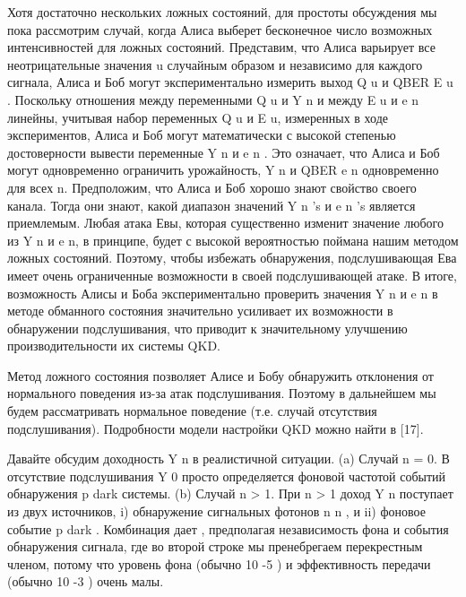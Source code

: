 Хотя достаточно нескольких ложных состояний, для простоты обсуждения мы пока рассмотрим случай, когда Алиса выберет бесконечное число возможных интенсивностей для ложных состояний. Представим, что Алиса варьирует все неотрицательные значения u случайным образом и независимо для каждого сигнала, Алиса и Боб могут экспериментально измерить выход Q u и QBER E u . Поскольку отношения между переменными Q u и Y n и между E u и e n линейны, учитывая набор переменных Q u и E u, измеренных в ходе экспериментов, Алиса и Боб могут математически с высокой степенью достоверности вывести переменные Y n и e n . Это означает, что Алиса и Боб могут одновременно ограничить урожайность, Y n и QBER e n одновременно для всех n. Предположим, что Алиса и Боб хорошо знают свойство своего канала. Тогда они знают, какой диапазон значений Y n 's и e n 's является приемлемым. Любая атака Евы, которая существенно изменит значение любого из Y n и e n, в принципе, будет с высокой вероятностью поймана нашим методом ложных состояний. Поэтому, чтобы избежать обнаружения, подслушивающая Ева имеет очень ограниченные возможности в своей подслушивающей атаке. В итоге, возможность Алисы и Боба экспериментально проверить значения Y n и e n в методе обманного состояния значительно усиливает их возможности в обнаружении подслушивания, что приводит к значительному улучшению производительности их системы QKD.

Метод ложного состояния позволяет Алисе и Бобу обнаружить отклонения от нормального поведения из-за атак подслушивания. Поэтому в дальнейшем мы будем рассматривать нормальное поведение (т.е. случай отсутствия подслушивания). Подробности модели настройки QKD можно найти в [17].

Давайте обсудим доходность Y n в реалистичной ситуации.
(a) Случай n = 0.
В отсутствие подслушивания Y 0 просто определяется фоновой частотой событий обнаружения p dark системы.
(b) Случай n > 1. При n > 1 доход Y n поступает из двух источников, i) обнаружение сигнальных фотонов n n , и ii) фоновое событие p dark . Комбинация дает , предполагая независимость фона и события обнаружения сигнала, где во второй строке мы пренебрегаем перекрестным членом, потому что уровень фона (обычно 10 -5 ) и эффективность передачи (обычно 10 -3 ) очень малы.

